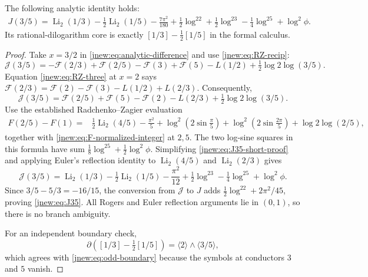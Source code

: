 \begin{theorem}
\label{jnew:thm:J35}
The following analytic identity holds:
\begin{align}
 \boxed{\displaystyle
 J(3/5)=\operatorname{Li}_2(1/3)-\frac12\operatorname{Li}_2(1/5)
 -\frac{7\pi^2}{180}+\frac12\log^22+\frac12\log^23
 -\frac14\log^25+\log^2\phi.}
 \label{jnew:eq:J35}
\end{align}
Its rational-dilogarithm core is exactly
$[1/3]-\tfrac12[1/5]$ in the formal calculus.
\end{theorem}
\begin{proof}
Take $x=3/2$ in \eqref{jnew:eq:analytic-difference} and use
\eqref{jnew:eq:RZ-recip}:
\[
 \mathcal J(3/5)
 =-\mathcal F(2/3)+\mathcal F(2/5)-\mathcal F(3)+\mathcal F(5)
  -L(1/2)+\tfrac12\log2\log(3/5).
\]
Equation \eqref{jnew:eq:RZ-three} at $x=2$ says
$\mathcal F(2/3)=\mathcal F(2)-\mathcal F(3)-L(1/2)+L(2/3)$.
Consequently,
\begin{equation}\label{jnew:eq:J35-short-proof}
 \mathcal J(3/5)=\mathcal F(2/5)+\mathcal F(5)-\mathcal F(2)
       -L(2/3)+\tfrac12\log2\log(3/5).
\end{equation}
Use the established Radchenko--Zagier evaluation
\cite[eq.~(24)]{RadchenkoZagier}
\begin{align*}
 F(2/5)-F(1)
  ={}&\tfrac12\operatorname{Li}_2(4/5)-\frac{\pi^2}{5}
    +\log^2\left(2\sin\frac\pi5\right)
    +\log^2\left(2\sin\frac{2\pi}5\right)
    +\log2\log(2/5),
\end{align*}
together with \eqref{jnew:eq:F-normalized-integer} at $2,5$.
The two log-sine squares in this formula have sum
$\tfrac18\log^25+\tfrac12\log^2\phi$.
Simplifying \eqref{jnew:eq:J35-short-proof} and applying Euler's
reflection identity to $\operatorname{Li}_2(4/5)$ and
$\operatorname{Li}_2(2/3)$ gives
\[
 \mathcal J(3/5)=\operatorname{Li}_2(1/3)
    -\tfrac12\operatorname{Li}_2(1/5)-\frac{\pi^2}{12}
    +\tfrac12\log^23-\tfrac14\log^25+\log^2\phi.
\]
Since $3/5-5/3=-16/15$, the conversion from $\mathcal J$ to $J$
adds $\tfrac12\log^22+2\pi^2/45$, proving
\eqref{jnew:eq:J35}. All Rogers and Euler reflection arguments
lie in $(0,1)$, so there is no branch ambiguity.

For an independent boundary check,
\[
 \partial\left([1/3]-\tfrac12[1/5]\right)
 =\langle2\rangle\wedge\langle3/5\rangle,
\]
which agrees with \eqref{jnew:eq:odd-boundary} because the symbols
at conductors $3$ and $5$ vanish.
\end{proof}

